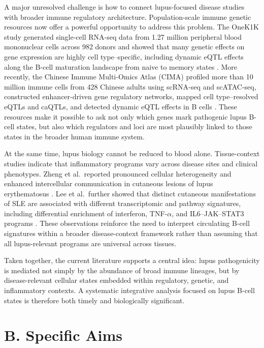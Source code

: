 A major unresolved challenge is how to connect lupus-focused disease studies with broader immune regulatory architecture. Population-scale immune genetic resources now offer a powerful opportunity to address this problem. The OneK1K study generated single-cell RNA-seq data from 1.27 million peripheral blood mononuclear cells across 982 donors and showed that many genetic effects on gene expression are highly cell type--specific, including dynamic eQTL effects along the B-cell maturation landscape from naive to memory states \cite{Yazar2022}. More recently, the Chinese Immune Multi-Omics Atlas (CIMA) profiled more than 10 million immune cells from 428 Chinese adults using scRNA-seq and scATAC-seq, constructed enhancer-driven gene regulatory networks, mapped cell type--resolved eQTLs and caQTLs, and detected dynamic eQTL effects in B cells \cite{Yin2026}. These resources make it possible to ask not only which genes mark pathogenic lupus B-cell states, but also which regulators and loci are most plausibly linked to those states in the broader human immune system.

At the same time, lupus biology cannot be reduced to blood alone. Tissue-context studies indicate that inflammatory programs vary across disease sites and clinical phenotypes. Zheng et al.\ reported pronounced cellular heterogeneity and enhanced intercellular communication in cutaneous lesions of lupus erythematosus \cite{Zheng2022}. Lee et al.\ further showed that distinct cutaneous manifestations of SLE are associated with different transcriptomic and pathway signatures, including differential enrichment of interferon, TNF-$\alpha$, and IL6--JAK--STAT3 programs \cite{Lee2025}. These observations reinforce the need to interpret circulating B-cell signatures within a broader disease-context framework rather than assuming that all lupus-relevant programs are universal across tissues.

Taken together, the current literature supports a central idea: lupus pathogenicity is mediated not simply by the abundance of broad immune lineages, but by disease-relevant cellular states embedded within regulatory, genetic, and inflammatory contexts. A systematic integrative analysis focused on lupus B-cell states is therefore both timely and biologically significant.

\section*{B. Specific Aims}

